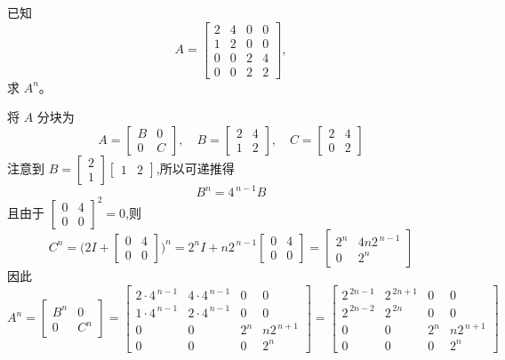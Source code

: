 \begin{questions}
    \question 已知 
    \[
    A=\begin{bmatrix} 
    2 & 4 & 0 & 0 \\ 
    1 & 2 & 0 & 0 \\ 
    0 & 0 & 2 & 4 \\ 
    0 & 0 & 2 & 2 
    \end{bmatrix}, 
    \] 
    求 $A^n$。
    \begin{solution}
        将 $A$ 分块为 
        \[
        A=\begin{bmatrix} B & 0 \\ 0 & C \end{bmatrix}, \quad 
        B=\begin{bmatrix} 2 & 4 \\ 1 & 2 \end{bmatrix}, \quad 
        C=\begin{bmatrix} 2 & 4 \\ 0 & 2 \end{bmatrix}
        \]
        注意到 $B = \begin{bmatrix} 2 \\ 1 \end{bmatrix} \begin{bmatrix} 1 & 2 \end{bmatrix}$,所以可递推得
        \[
        B^n = 4^{\,n-1} B
        \]
        且由于 $\begin{bmatrix} 0 & 4 \\ 0 & 0 \end{bmatrix}^2 = 0$,则
        \[
        C^n = \bigl(2I + \begin{bmatrix} 0 & 4 \\ 0 & 0 \end{bmatrix}\bigr)^n = 2^n I + n2^{\,n-1} \begin{bmatrix} 0 & 4 \\ 0 & 0 \end{bmatrix} = \begin{bmatrix} 2^n & 4n2^{\,n-1} \\ 0 & 2^n \end{bmatrix}
        \]
        因此
        \[
        A^n = \begin{bmatrix} B^n & 0 \\ 0 & C^n \end{bmatrix} 
        = \begin{bmatrix}
        2 \cdot 4^{\,n-1} & 4 \cdot 4^{\,n-1} & 0 & 0 \\
        1 \cdot 4^{\,n-1} & 2 \cdot 4^{\,n-1} & 0 & 0 \\
        0 & 0 & 2^n & n 2^{\,n+1} \\
        0 & 0 & 0 & 2^n
        \end{bmatrix} 
        = \begin{bmatrix}
        2^{\,2n-1} & 2^{\,2n+1} & 0 & 0 \\
        2^{\,2n-2} & 2^{\,2n} & 0 & 0 \\
        0 & 0 & 2^n & n 2^{\,n+1} \\
        0 & 0 & 0 & 2^n
        \end{bmatrix}
        \]
    \end{solution}


\end{questions}
